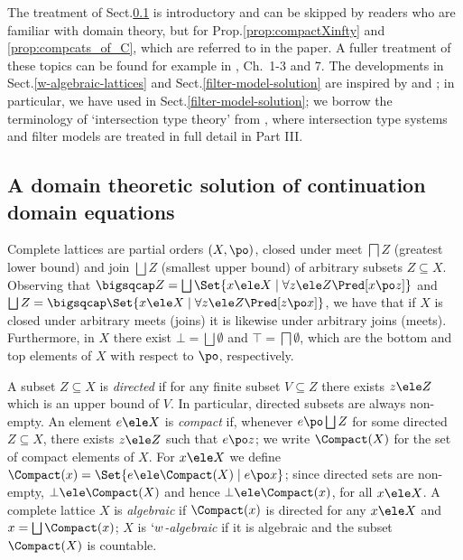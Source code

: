 \documentclass{lmcs}
\begin{document}
The treatment of Sect.\skp\ref{sub:domainTheoretic} is introductory and can be skipped by readers who are familiar with domain theory, but for Prop.\skp\ref{prop:compactXinfty} and \ref{prop:compcats_of_C}, which are referred to in %
the paper. 
A fuller treatment of these topics can be found for example in \cite{Amadio-Curien'98}, Ch.~1-3 and 7. 
The developments in Sect.\skp\ref{w-algebraic-lattices} and Sect.\skp\ref{filter-model-solution} are inspired by \cite{BCD'83,Coppo-et.al'84} and \cite{Abramsky'91}; in particular, we have used \cite{Dezani-Honsell-Alessi'03} in Sect.\skp\ref{filter-model-solution}; we borrow the terminology of `intersection type theory' from \cite{Bar2013}, where intersection type systems and filter models are treated in full detail in Part III.

 \subsection{A domain theoretic solution of continuation domain equations} \label{sub:domainTheoretic}

Complete lattices are partial orders $(X,\po)$, closed under meet $\bigsqcap Z$ 
(greatest lower bound) and join $\bigsqcup Z$ (smallest upper bound) of arbitrary subsets $Z\subseteq X$. 
Observing that $\bigsqcap Z = \bigsqcup \Set{x \ele X \mid \forall z \ele Z \Pred[x \po z]}$ and $\bigsqcup Z = \bigsqcap \Set{x \ele X \mid \forall z \ele Z \Pred[ z \po x]}$, we have that if $X$ is closed under arbitrary meets (joins) it is likewise under arbitrary joins (meets). 
Furthermore, in $X$ there exist $\bot = \bigsqcup \emptyset$ and $\top = \bigsqcap \emptyset$, which are the bottom and top elements of $X$ with respect to $\po$, respectively.

A subset $Z\subseteq X$ is \emph{directed} if for any finite subset $V\subseteq Z$ there exists $z\ele Z$ which is an upper bound of $V$. 
In particular, directed subsets are always non-empty. An element $e\ele X$ is \emph{compact} if, whenever $e \po \bigsqcup Z$ for some directed $Z\subseteq X$, there exists $z\ele Z$ such that $e \po z$; we write $\Compact(X)$ for the set of compact elements of $X$. 
For $x\ele X$ we define $\Compact(x) = \Set{e \ele \Compact(X) \mid e \po x}$;
since directed sets are non-empty, $\bot \ele \Compact(X)$ and hence $\bot\ele \Compact(x)$, for all $x\ele X$. 
A complete lattice $X$ is \emph{algebraic} if $\Compact(x)$ is directed for any $x\ele X$ and $x = \bigsqcup \Compact(x)$; $X$ is \emph{$`w$-algebraic} if it is algebraic and the subset $\Compact(X)$ is countable.
\end{document}

